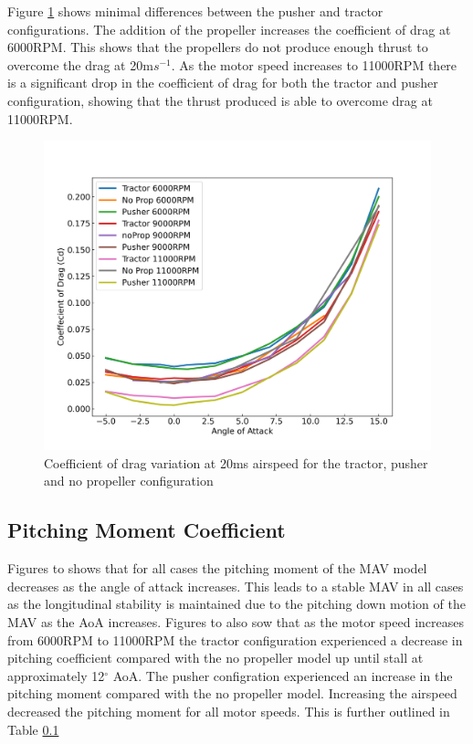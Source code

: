 Figure \ref{fig:Cd_20ms} shows minimal differences between the pusher and tractor configurations. The addition of the propeller increases the coefficient of drag at 6000RPM. This shows that the propellers do not produce enough thrust to overcome the drag at 20m$s^{-1}$. As the motor speed increases to 11000RPM there is a significant drop in the coefficient of drag for both the tractor and pusher configuration, showing that the thrust produced is able to overcome drag at 11000RPM. 
\begin{figure}[H]
    \centering
    \includegraphics[scale = 0.7]{05_Results/Figs/Cd/20ms_Cd.png}
    \caption{Coefficient of drag variation at 20ms airspeed for the tractor, pusher and no propeller configuration}
    \label{fig:Cd_20ms}
\end{figure}



\subsection{Pitching Moment Coefficient}

Figures  to  shows that for all cases the pitching moment of the MAV model decreases as the angle of attack increases. This leads to a stable MAV in all cases as the longitudinal stability is maintained due to the pitching down motion of the MAV as the \acrshort{AoA} increases. Figures  to  also sow that as the motor speed increases from 6000RPM to 11000RPM the tractor configuration experienced a decrease in pitching coefficient compared with the no propeller model up until stall at approximately 12$^\circ$ AoA. The pusher configration experienced an increase in the pitching moment compared with the no propeller model. Increasing the airspeed decreased the pitching moment for all motor speeds. This is further outlined in Table \ref{} 

